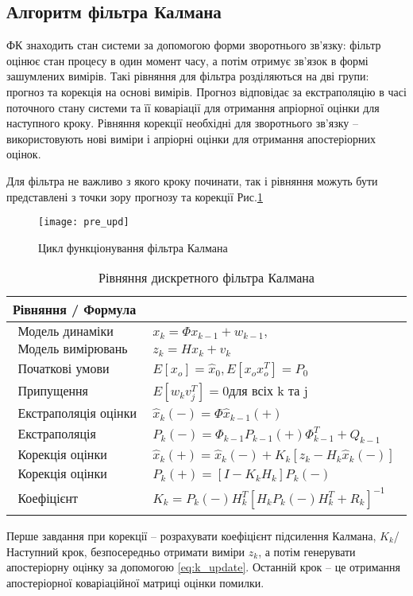 \subsection{Алгоритм фільтра Калмана}

ФК знаходить стан системи за допомогою форми зворотнього зв'язку: фільтр
оцінює стан процесу в один момент часу, а потім отримує зв'язок в формі
зашумлених вимірів. Такі рівняння для фільтра розділяються на дві групи: 
прогноз та корекція на основі вимірів. Прогноз відповідає за екстраполяцію
в часі поточного стану системи та її коваріації для отримання апріорної
оцінки для наступного кроку. Рівняння корекції необхідні для зворотнього
зв'язку -- використовують нові виміри і апріорні оцінки для отримання 
апостеріорних оцінок.

Для фільтра не важливо з якого кроку починати, так і рівняння можуть бути 
представлені з точки зору прогнозу та корекції Рис.\ref{fig:basic_cycle}
\begin{figure}[here]
\centering
\texttt{[image: pre\_upd]}
\caption{Цикл функціонування фільтра Калмана }
\label{fig:basic_cycle}
\end{figure} 

\begin{table}[here]
\small
\caption{Рівняння дискретного фільтра Калмана}
\centering
\begin{tabular}{|p{160mm}|} \hline 
Рівняння / Формула \\ \hline 
\begin{eqnarray} 
\text{Модель динаміки системи}  &  \label{eq:kalman_1} x_{k} = \Phi x_{k-1} + w_{k-1}, \\  
\text{Модель вимірювань}  & \label{eq:kalman_2} z_{k} = Hx_{k} +v_{k} \\ 
\text{Початкові умови}  &\label{eq:kalman_3} E[x_{o}] = \hat{x}_{0}, E[x_{o} x_{o}^{T}] = P_{0} \\
\text{Припущення незалежності}  &  \label{eq:kalman_4} E[w_{k} v_{j}^{T}] = 0 \text{для всіх k та j} \\
\text{Екстраполяція оцінки (прогноз)}  &  \label{eq:kalman_5} \hat{x}_{k}(-) = \Phi \hat{x}_{k-1}(+)\\
\text{Екстраполяція коваріації}  &  \label{eq:kalman_6} P_{k}(-) = \Phi_{k-1} P_{k-1}(+)\Phi_{k-1}^{T} + Q_{k-1} \\ 
\text{Корекція оцінки}  &  \label{eq:kalman_7} \hat{x}_{k}(+) = \hat{x}_{k}(-) + K_{k}[z_{k}-H_{k}\hat{x}_{k}(-)]\\
\text{Корекція оцінки коваріації}  &  \label{eq:kalman_8} P_{k}(+) = [I - K_{k}H_{k}]P_{k}(-)\\
\text{Коефіцієнт підсилення Калмана}   &  \label{eq:kalman_9} K_{k}= P_{k}(-)H_{k}^{T}[H_{k}P_{k}(-)H_{k}^{T} + R_{k}]^{-1}\end{eqnarray} \\  \hline
\end{tabular}
\label{tb:ac}
\end{table}
Перше завдання при корекції -- розрахувати коефіцієнт підсилення Калмана, $K_{k}$/
Наступний крок, безпосередньо отримати виміри $z_{k}$, а потім генерувати 
апостеріорну оцінку за допомогою \eqref{eq:k_update}. Останній крок  -- це 
отримання апостеріорної коваріаційної матриці оцінки помилки.

